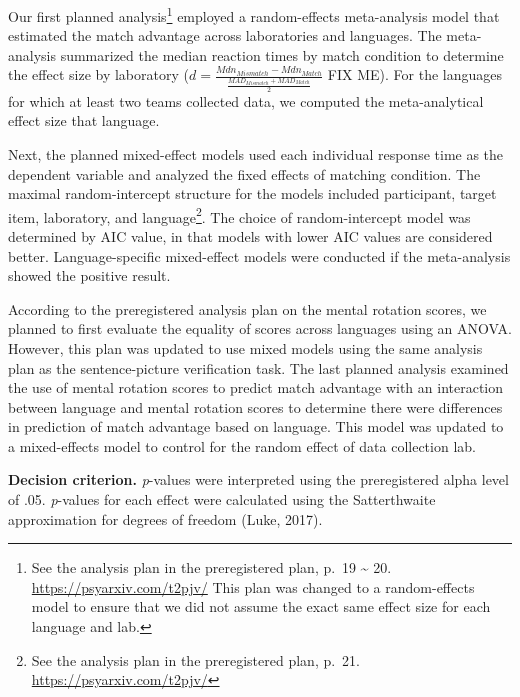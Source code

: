 \documentclass[
  man]{apa7}
\begin{document}
Our first planned analysis\footnote{See the analysis plan in the preregistered plan, p.~19 \textasciitilde{} 20. \url{https://psyarxiv.com/t2pjv/} This plan was changed to a random-effects model to ensure that we did not assume the exact same effect size for each language and lab.} employed a random-effects meta-analysis model that estimated the match advantage across laboratories and languages. The meta-analysis summarized the median reaction times by match condition to determine the effect size by laboratory (\(d = \frac{Mdn_{Mismatch} - Mdn_{Match}}{\frac{MAD_{Mismatch} + MAD_{Match}}{2}}\) FIX ME). For the languages for which at least two teams collected data, we computed the meta-analytical effect size that language.

Next, the planned mixed-effect models used each individual response time as the dependent variable and analyzed the fixed effects of matching condition. The maximal random-intercept structure for the models included participant, target item, laboratory, and language\footnote{See the analysis plan in the preregistered plan, p.~21. \url{https://psyarxiv.com/t2pjv/}}. The choice of random-intercept model was determined by AIC value, in that models with lower AIC values are considered better. Language-specific mixed-effect models were conducted if the meta-analysis showed the positive result.

According to the preregistered analysis plan on the mental rotation scores, we planned to first evaluate the equality of scores across languages using an ANOVA. However, this plan was updated to use mixed models using the same analysis plan as the sentence-picture verification task. The last planned analysis examined the use of mental rotation scores to predict match advantage with an interaction between language and mental rotation scores to determine there were differences in prediction of match advantage based on language. This model was updated to a mixed-effects model to control for the random effect of data collection lab.

\textbf{Decision criterion.} \emph{p}-values were interpreted using the preregistered alpha level of .05. \emph{p}-values for each effect were calculated using the Satterthwaite approximation for degrees of freedom (Luke, 2017).
\end{document}
